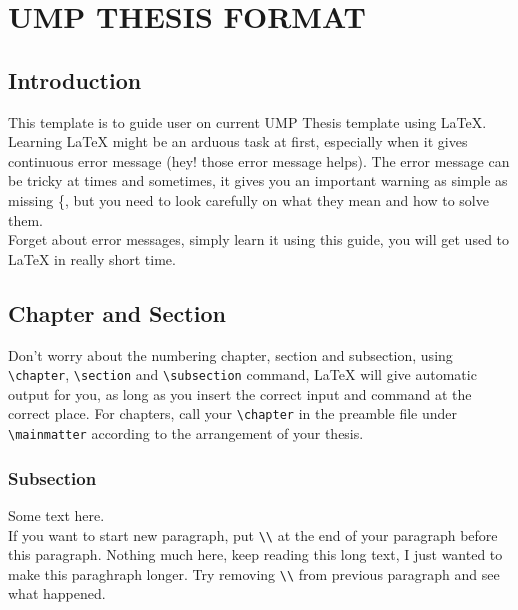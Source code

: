 \chapter{UMP THESIS FORMAT}

\section{Introduction}
This template is to guide user on current UMP Thesis template using {\LaTeX}. Learning {\LaTeX} might be an arduous task at first, especially when it gives continuous error message (hey! those error message helps). The error message can be tricky at times and sometimes, it gives you an important warning as simple as missing \{, but you need to look carefully on what they mean and how to solve them.\\

Forget about error messages, simply learn it using this guide, you will get used to {\LaTeX} in
really short time.

\section{Chapter and Section}
Don't worry about the numbering chapter, section and subsection, using \verb+\chapter+,
\verb+\section+ and \verb+\subsection+ command, {\LaTeX} will give automatic output for you, as long
as you insert the correct input and command at the correct place. For chapters, call your
\verb+\chapter+ in the preamble file under \verb+\mainmatter+ according to the arrangement of your
thesis.

\subsection{Subsection}
Some text here.\\

If you want to start new paragraph, put \verb+\\+ at the end of your paragraph before this paragraph. Nothing much here, keep reading this long text, I just wanted to make this paraghraph longer. Try removing \verb+\\+ from previous paragraph and see what happened.\\

